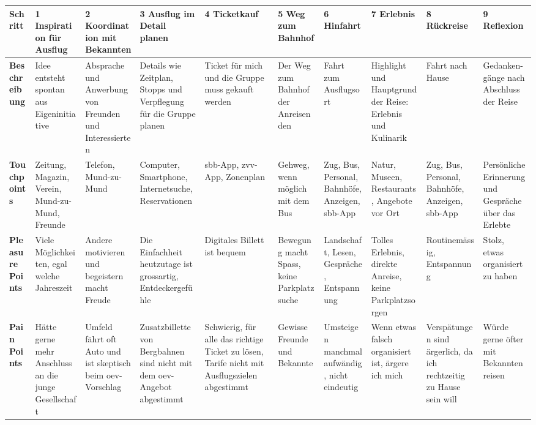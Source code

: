 \begin{center}
{\small
\setlength{\tabcolsep}{4pt}
\renewcommand{\arraystretch}{1.25}
\begin{tabular}{|p{2.6cm}|*{9}{p{2.08cm}|}}
\hline
\textbf{Schritt} & \textbf{1 Inspiration für Ausflug} & \textbf{2 Koordination mit Bekannten} & \textbf{3 Ausflug im Detail planen} & \textbf{4 Ticketkauf} & \textbf{5 Weg zum Bahnhof} & \textbf{6 Hinfahrt} & \textbf{7 Erlebnis} & \textbf{8 Rückreise} & \textbf{9 Reflexion} \\
\hline
\rowcolor{white}
\cellcolor{definePastel}\textbf{Beschreibung} & Idee entsteht spontan aus Eigeninitiative & Absprache und Anwerbung von Freunden und Interessierten & Details wie Zeitplan, Stopps und Verpflegung für die Gruppe planen & Ticket für mich und die Gruppe muss gekauft werden & Der Weg zum Bahnhof der Anreisenden & Fahrt zum Ausflugsort & Highlight und Hauptgrund der Reise: Erlebnis und Kulinarik & Fahrt nach Hause & Gedanken-gänge nach Abschluss der Reise \\
\hline
\rowcolor{white}
\cellcolor{definePastel}\textbf{Touchpoints} & Zeitung, Magazin, Verein, Mund-zu-Mund, Freunde & Telefon, Mund-zu-Mund & Computer, Smartphone, Internetsuche, Reservationen & \gls{sbb}-App, \gls{zvv}-App, Zonenplan & Gehweg, wenn möglich mit dem Bus & Zug, Bus, Personal, Bahnhöfe, Anzeigen, \gls{sbb}-App & Natur, Museen, Restaurants, Angebote vor Ort & Zug, Bus, Personal, Bahnhöfe, Anzeigen, \gls{sbb}-App & Persönliche Erinnerung und Gespräche über das Erlebte \\
\hline
\rowcolor{fbPositiv}
\cellcolor{definePastel}\textbf{Pleasure Points} & Viele Möglichkeiten, egal welche Jahreszeit & Andere motivieren und begeistern macht Freude & Die Einfachheit heutzutage ist grossartig, Entdeckergefühle & Digitales Billett ist bequem & Bewegung macht Spass, keine Parkplatzsuche & Landschaft, Lesen, Gespräche, Entspannung & Tolles Erlebnis, direkte Anreise, keine Parkplatzsorgen & Routinemässig, Entspannung & Stolz, etwas organisiert zu haben \\
\hline
\rowcolor{fbOptimieren}
\cellcolor{definePastel}\textbf{Pain Points} & Hätte gerne mehr Anschluss an die junge Gesellschaft & Umfeld fährt oft Auto und ist skeptisch beim \gls{oev}-Vorschlag & Zusatzbillette von Bergbahnen sind nicht mit dem \gls{oev}-Angebot abgestimmt & Schwierig, für alle das richtige Ticket zu lösen, Tarife nicht mit Ausflugszielen abgestimmt & Gewisse Freunde und Bekannte & Umsteigen manchmal aufwändig, nicht eindeutig & Wenn etwas falsch organisiert ist, ärgere ich mich & Verspätungen sind ärgerlich, da ich rechtzeitig zu Hause sein will & Würde gerne öfter mit Bekannten reisen \\

\end{tabular}}
\end{center}

